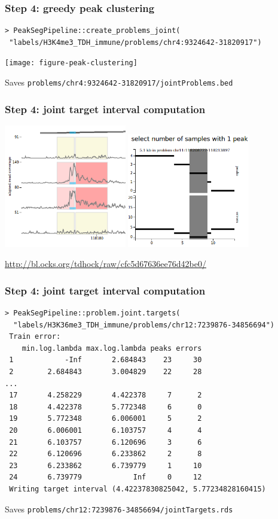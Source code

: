 \documentclass{beamer}
\begin{document}
\begin{frame}[fragile]
  \frametitle{Step 4: greedy peak clustering}
\small
\begin{verbatim}
> PeakSegPipeline::create_problems_joint(
 "labels/H3K4me3_TDH_immune/problems/chr4:9324642-31820917")
\end{verbatim}
  \texttt{[image: figure-peak-clustering]}

Saves \verb|problems/chr4:9324642-31820917/jointProblems.bed|
\end{frame}

\begin{frame}
  \frametitle{Step 4: joint target interval computation}
  \includegraphics[width=0.4\textwidth]{Screenshot-joint-interval-coverage}
  \includegraphics[width=0.4\textwidth]{Screenshot-joint-interval-penalty}

\url{http://bl.ocks.org/tdhock/raw/cfc5d67636ee76d42be0/}
\end{frame}

\begin{frame}[fragile]
  \frametitle{Step 4: joint target interval computation}
\small
\begin{verbatim}
> PeakSegPipeline::problem.joint.targets(
  "labels/H3K36me3_TDH_immune/problems/chr12:7239876-34856694")
 Train error:
    min.log.lambda max.log.lambda peaks errors
 1            -Inf       2.684843    23     30
 2        2.684843       3.004829    22     28
...
 17       4.258229       4.422378     7      2
 18       4.422378       5.772348     6      0
 19       5.772348       6.006001     5      2
 20       6.006001       6.103757     4      4
 21       6.103757       6.120696     3      6
 22       6.120696       6.233862     2      8
 23       6.233862       6.739779     1     10
 24       6.739779            Inf     0     12
 Writing target interval (4.42237830825042, 5.77234828160415)
\end{verbatim}

Saves \verb|problems/chr12:7239876-34856694/jointTargets.rds|
\end{frame}
\end{document}
